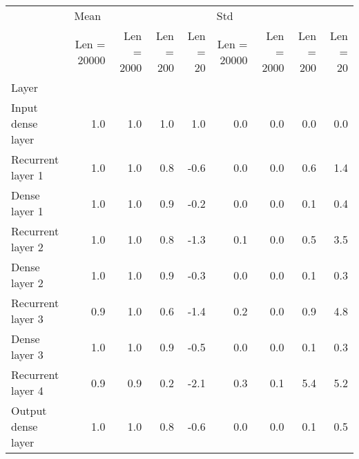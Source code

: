 \begin{tabular}{lrrrrrrrr}
\toprule
{} & \multicolumn{4}{l}{Mean} & \multicolumn{4}{l}{Std} \\
{} & Len  = 20000 & Len  = 2000 & Len  = 200 & Len  = 20 & Len  = 20000 & Len  = 2000 & Len  = 200 & Len  = 20 \\
Layer              &              &             &            &           &              &             &            &           \\
\midrule
Input dense layer  &          1.0 &         1.0 &        1.0 &       1.0 &          0.0 &         0.0 &        0.0 &       0.0 \\
Recurrent layer 1  &          1.0 &         1.0 &        0.8 &      -0.6 &          0.0 &         0.0 &        0.6 &       1.4 \\
Dense layer 1      &          1.0 &         1.0 &        0.9 &      -0.2 &          0.0 &         0.0 &        0.1 &       0.4 \\
Recurrent layer 2  &          1.0 &         1.0 &        0.8 &      -1.3 &          0.1 &         0.0 &        0.5 &       3.5 \\
Dense layer 2      &          1.0 &         1.0 &        0.9 &      -0.3 &          0.0 &         0.0 &        0.1 &       0.3 \\
Recurrent layer 3  &          0.9 &         1.0 &        0.6 &      -1.4 &          0.2 &         0.0 &        0.9 &       4.8 \\
Dense layer 3      &          1.0 &         1.0 &        0.9 &      -0.5 &          0.0 &         0.0 &        0.1 &       0.3 \\
Recurrent layer 4  &          0.9 &         0.9 &        0.2 &      -2.1 &          0.3 &         0.1 &        5.4 &       5.2 \\
Output dense layer &          1.0 &         1.0 &        0.8 &      -0.6 &          0.0 &         0.0 &        0.1 &       0.5 \\
\bottomrule
\end{tabular}
